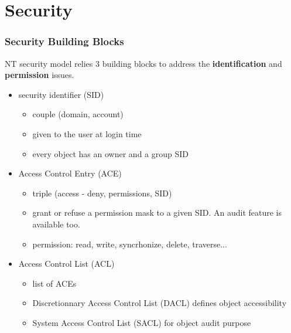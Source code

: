 \section{Security}



\begin{frame}
  \frametitle{Security Building Blocks}

  NT security model relies 3 building blocks to address the
  \textbf{identification} and \textbf{permission} issues.

  \begin{itemize}

    \item
      security identifier (SID)
      \begin{itemize}
      \item
        couple (domain, account)
      \item
        given to the user at login time
      \item
        every object has an owner and a group SID
      \end{itemize}

    \item
      Access Control Entry (ACE)
      \begin{itemize}
        \item
          triple (access - deny, permissions, SID)
        \item
          grant or refuse a permission mask to a given SID. An audit feature is available too.
        \item
          permission: read, write, syncrhonize, delete, traverse...
      \end{itemize}

    \item
      Access Control List (ACL)
      \begin{itemize}
        \item
          list of ACEs
        \item
          Discretionnary Access Control List (DACL) defines object accessibility
        \item
          System Access Control List (SACL) for object audit purpose
      \end{itemize}

  \end{itemize}

\end{frame}


